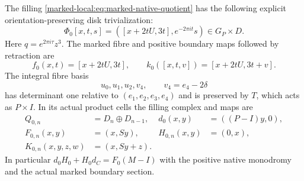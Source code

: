 \begin{theorem}\label{marked-local:thm:marked-native-filling}
The filling \eqref{marked-local:eq:marked-native-quotient} has the following
explicit orientation-preserving disk trivialization:
\begin{equation}\label{marked-local:eq:marked-native-Phi}
 \Phi_0[x,t,s]=([x+2tU,3t],e^{-2\pi it}s)
                 \in G_P\times D.
\end{equation}
Here $q=e^{2\pi i\tau}z^3$. The marked fibre and positive
boundary maps followed by retraction are
\begin{equation}\label{marked-local:eq:marked-native-FK}
 f_0(x,t)=[x+2tU,3t],\qquad
 k_0([x,t,v])=[x+2tU,3t+v].
\end{equation}
The integral fibre basis
\begin{equation}\label{marked-local:eq:marked-cell-basis}
             u_0,u_1,u_2,v_4,\qquad v_4=e_4-2\delta
\end{equation}
has determinant one relative to $(e_1,e_2,e_3,e_4)$ and is
preserved by $T$, which acts as $P\times I$. In its actual
product cells the filling complex and maps are
\begin{equation}\label{marked-local:eq:marked-final-chains}
 \begin{aligned}
 Q_{0,n}&=D_n\oplus D_{n-1},&d_0(x,y)&=((P-I)y,0),\\
 F_{0,n}(x,y)&=(x,Sy),&H_{0,n}(x,y)&=(0,x),\\
 K_{0,n}(x,y,z,w)&=(x,Sy+z).&&
 \end{aligned}
\end{equation}
In particular $d_0H_0+H_0d_C=F_0(M-I)$ with the positive
native monodromy and the actual marked boundary section.
\end{theorem}
